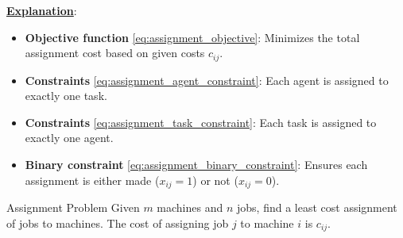\medskip
\underline{\textbf{Explanation}}:
\begin{itemize}
    \item \textbf{Objective function} \eqref{eq:assignment_objective}: Minimizes the total assignment cost based on given costs \( c_{ij} \).
    \item \textbf{Constraints} \eqref{eq:assignment_agent_constraint}: Each agent is assigned to exactly one task.
    \item \textbf{Constraints} \eqref{eq:assignment_task_constraint}: Each task is assigned to exactly one agent.
    \item \textbf{Binary constraint} \eqref{eq:assignment_binary_constraint}: Ensures each assignment is either made (\( x_{ij} = 1 \)) or not (\( x_{ij} = 0 \)).
\end{itemize}


%

\begin{general}{Assignment Problem}{}{}
Given $m$ machines and $n$ jobs, find a least cost assignment of jobs to machines. The cost of assigning job $j$ to machine $i$ is $c_{ij}$.
\end{general}
%

